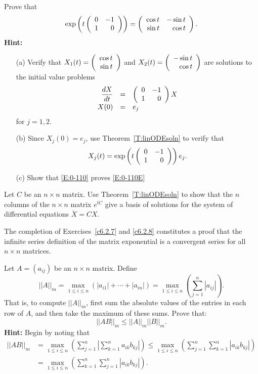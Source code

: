 \documentclass{ximera}
\begin{document}
\begin{exercise}  \label{c6.2.5C}
Prove that
\begin{equation}  \label{E:0-110E}
\exp\left(t\left(\begin{array}{rr} 0 & -1\\ 1 &0\end{array}\right)\right) =
\left(\begin{array}{rr} \cos t & -\sin t\\ \sin t &\cos t\end{array}\right).
\end{equation}
{\bf Hint:}
\begin{itemize}
\item[(a)] Verify that $X_1(t) = \left(\begin{array}{r} \cos t \\ \sin t\end{array}\right)$ and
$X_2(t) = \left(\begin{array}{r} -\sin t \\ \cos t\end{array}\right)$ are solutions to the initial value problems
\begin{equation}  \label{E:init3}
\begin{array}{rcl}
\displaystyle\frac{dX}{dt} & = & \left(\begin{array}{rr} 0 & -1\\ 1 &0\end{array}\right)X \\
X(0) & = & e_j
\end{array}
\end{equation}
for $j=1,2$.
\item[(b)] Since $X_j(0)=e_j$, use Theorem~\ref{T:linODEsoln} to verify that
\begin{equation}   \label{E:0-110}
X_j(t) = \exp\left(t\left(\begin{array}{rr} 0 & -1\\ 1 &0\end{array}\right)\right)e_j.
\end{equation}
\item[(c)]  Show that \eqref{E:0-110} proves \eqref{E:0-110E}
\end{itemize}
\end{exercise}

\begin{exercise}  \label{c6.2.6A}
Let $C$ be an $n\times n$ matrix.  Use Theorem~\ref{T:linODEsoln} to show
that the $n$ columns of the $n\times n$ matrix $e^{tC}$ give a basis of
solutions for the system of differential equations $\dot{X}=CX$.
\end{exercise}

  The completion of Exercises~\ref{c6.2.7} and
\ref{c6.2.8} constitutes a proof that the infinite series definition of
the matrix exponential is a convergent series for all $n\times n$ matrices.

\begin{exercise}  \label{c6.2.7}
Let $A=(a_{ij})$ be an $n\times n$ matrix.  Define
\[
||A||_m = \max_{1\leq i\leq n} (|a_{i1}|+\cdots+|a_{in}|)
= \max_{1\leq i\leq n} \left(\sum_{j=1}^n|a_{ij}|\right).
\]
That is, to compute $||A||_m$, first sum the absolute values of the entries
in each row of $A$, and then take the maximum of these sums.  Prove that:
\[
||AB||_m \leq ||A||_m ||B||_m.
\]
{\bf Hint:} Begin by noting that
\begin{align*}
||AB||_m &=
\max_{1\leq i\leq n}\left(\sum_{j=1}^n\left|\sum_{k=1}^na_{ik}b_{kj}\right|
\right)\leq \max_{1\leq i\leq n}\left(\sum_{j=1}^n\sum_{k=1}^n\left|a_{ik}b_{kj}
           \right|\right) \\
  &= \max_{1\leq i\leq n}\left(\sum_{k=1}^n\sum_{j=1}^n
\left|a_{ik}b_{kj}\right|\right).
\end{align*}
\end{exercise}
\end{document}
